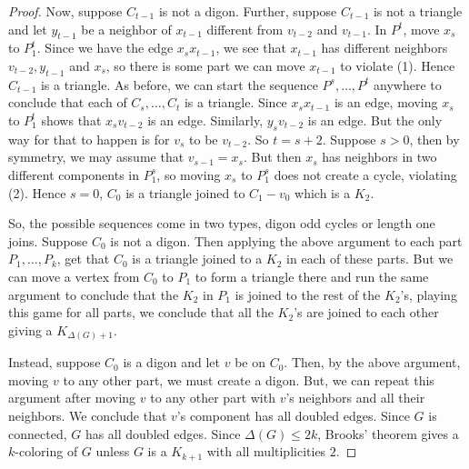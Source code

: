 \documentclass[12pt]{amsart}
\theoremstyle{plain}
\theoremstyle{definition}
\theoremstyle{remark}
\begin{document}
\begin{proof}
Now, suppose $C_{t-1}$ is not a digon.  Further, suppose $C_{t-1}$ is not a triangle and let $y_{t-1}$ be a neighbor of $x_{t-1}$ different from $v_{t-2}$ and $v_{t-1}$. In $P^t$, move $x_s$ to $P^t_1$.  Since we have the edge $x_sx_{t-1}$, we see that $x_{t-1}$ has different neighbors $v_{t-2}, y_{t-1}$ and $x_s$, so there is some part we can move $x_{t-1}$ to violate (1).  Hence $C_{t-1}$ is a triangle.  As before, we can start the sequence $P^s, \ldots, P^t$ anywhere to conclude that each of $C_s, \ldots, C_t$ is a triangle. Since $x_sx_{t-1}$ is an edge, moving $x_s$ to $P^t_1$ shows that $x_sv_{t-2}$ is an edge.  Similarly, $y_sv_{t-2}$ is an edge.  But the only way for that to happen is for $v_s$ to be $v_{t-2}$.  So $t = s + 2$.  Suppose $s > 0$, then by symmetry, we may assume that $v_{s-1} = x_s$.  But then $x_s$ has neighbors in two different components in $P^s_1$, so moving $x_s$ to $P^s_1$ does not create a cycle, violating (2).  Hence $s = 0$, $C_0$ is a triangle joined to $C_1 - v_0$ which is a $K_2$.

So, the possible sequences come in two types, digon odd cycles or length one joins.  Suppose $C_0$ is not a digon.  Then applying the above argument to each part $P_1, \ldots, P_k$, get that $C_0$ is a triangle joined to a $K_2$ in each of these parts.  But we can move a vertex from $C_0$ to $P_1$ to form a triangle there and run the same argument to conclude that the $K_2$ in $P_1$ is joined to the rest of the $K_2$'s, playing this game for all parts, we conclude that all the $K_2$'s are joined to each other giving a $K_{\Delta(G) + 1}$.

Instead, suppose $C_0$ is a digon and let $v$ be on $C_0$.  Then, by the above argument, moving $v$ to any other part, we must create a digon.  But, we can repeat this argument after moving $v$ to any other part with $v$'s neighbors and all their neighbors.  We conclude that $v$'s component has all doubled edges.  Since $G$ is connected, $G$ has all doubled edges.  Since $\Delta(G) \le 2k$, Brooks' theorem gives a $k$-coloring of $G$ unless $G$ is a $K_{k+1}$ with all multiplicities $2$.
\end{proof}




\end{document}
